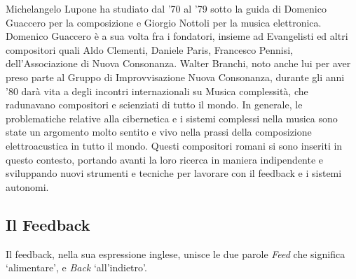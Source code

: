 Michelangelo Lupone ha studiato dal '70 al '79 sotto la guida di Domenico Guaccero 
per la composizione e Giorgio Nottoli per la musica elettronica. 
Domenico Guaccero è a sua volta fra i fondatori, insieme ad Evangelisti
ed altri compositori
quali Aldo Clementi, Daniele Paris, Francesco Pennisi,
dell'Associazione di Nuova Consonanza.
Walter Branchi, noto anche lui
per aver preso parte al Gruppo di Improvvisazione Nuova Consonanza,
durante gli anni '80 darà vita a degli incontri internazionali su
Musica complessità, che radunavano compositori e scienziati di
tutto il mondo.
In generale, le problematiche relative alla cibernetica e i sistemi complessi nella musica
sono state un argomento molto sentito e vivo nella prassi della composizione elettroacustica in tutto il mondo. 
Questi compositori romani si sono inseriti in questo contesto, 
portando avanti la loro ricerca in maniera indipendente e sviluppando nuovi strumenti e 
tecniche per lavorare con il feedback e i sistemi autonomi.

\clearpage

\subsection{Il Feedback}
\label{sec:Il Feedback}
Il feedback, nella sua espressione inglese, 
unisce le due parole \textit{Feed} che significa ‘alimentare’, 
e \textit{Back} ‘all’indietro’. 



